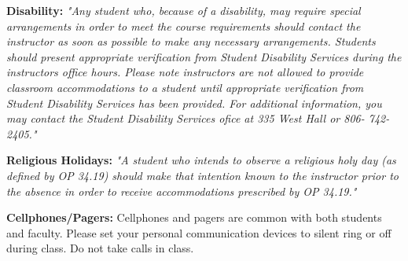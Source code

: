 \documentclass[12pt]{article}
\begin{document}
\begin{tabular}{p{0.25in}p{5.8in}p{0.2in}}
\hline
\end{tabular}

\textbf{Disability:}
\textsl{ "Any student who, because of a disability, may require special arrangements in order to meet
the course requirements should contact the instructor as soon as possible to make any necessary arrangements.
Students should present appropriate verification from Student Disability Services during the instructors office hours. Please note instructors are not allowed to provide classroom accommodations
to a student until appropriate verification from Student Disability Services has been provided.
For additional information, you may contact the Student Disability Services ofice at 335 West Hall or
806- 742-2405."}

\textbf{Religious Holidays:}
\textsl{ "A student who intends to observe a religious holy day (as defined by OP 34.19) should
make that intention known to the instructor prior to the absence in order to receive accommodations
prescribed by OP 34.19."}

\textbf{Cellphones/Pagers: }
Cellphones and pagers are common with both students and faculty. 
Please set your personal communication devices to silent ring or off during class. 
Do not take calls in class. 
\end{document}
